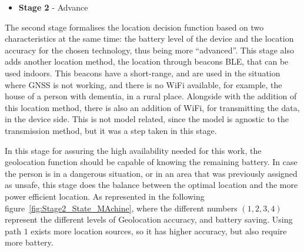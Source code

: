 \begin{itemize}
\item \textbf{Stage 2} - Advance
\end{itemize}


The second stage formalises the location decision
function based on two characteristics at the same time: the
battery level of the device and the location accuracy for the
chosen technology, thus being more “advanced”. 
This stage also adds another location method, the location through beacons BLE, that can be used indoors. This beacons have a short-range, and are used in the situation where GNSS is not working, and there is no WiFi available, for example, the house of a person with dementia, in a rural place. 
Alongside with the addition of this location method, there is also an addition of WiFi, for transmitting the data, in the device side. This is not model related, since the model is agnostic to the transmission method, but it was a step taken in this stage.

In this stage for assuring the high availability needed for this work, the geolocation function should be capable of
knowing the remaining battery. In case the person is in a dangerous situation, or in an area that was previously assigned as unsafe, this stage does the balance between the optimal location and the more power efficient location.
As represented in the following figure~\ref{fig:Stage2_State_MAchine}, where the different numbers $(1, 2, 3, 4)$ represent the different levels of Geolocation accuracy, and battery saving. Using path $1$ exists more location sources, so it has higher accuracy, but also require more battery. 

